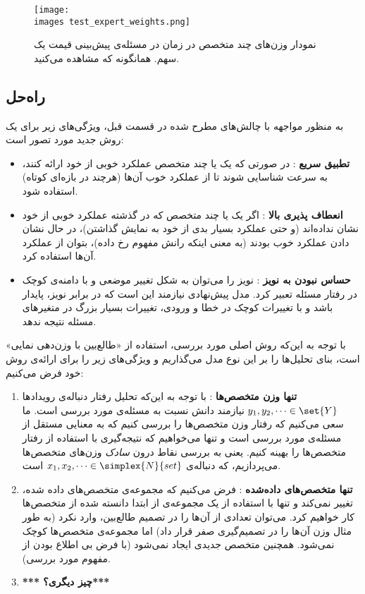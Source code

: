 \begin{figure}[h!]
\texttt{[image: \\images test\_expert\_weights.png]}
\caption{
نمودار وزن‌های چند متخصص در زمان در مسئله‌ی پیش‌بینی قیمت یک سهم. همانگونه که مشاهده می‌کنید.
}
\label{fig:wmstatic}
\end{figure}




\subsection{
راه‌حل
} 
به منظور مواجهه با چالش‌های مطرح شده در قسمت قبل، ویژگی‌های زیر برای یک روش جدید مورد تصور است:
\begin{itemize}
\item \textbf{
تطبیق سریع
}: 
در صورتی که یک یا چند متخصص عملکرد خوبی از خود ارائه کنند، به سرعت شناسایی شوند تا از عملکرد خوب آن‌ها (هرچند در بازه‌ای کوتاه) استفاده شود.
\item \textbf{
انعطاف پذیری بالا
}: 
اگر یک یا چند متخصص که در گذشته عملکرد خوبی از خود نشان نداده‌اند (و حتی عملکرد بسیار بدی از خود به نمایش گذاشتن)، در حال نشان دادن عملکرد خوب بودند (به معنی اینکه رانش مفهوم رخ داده)، بتوان از عملکرد آن‌ها استفاده کرد.

\item \textbf{
حساس نبودن به نویز
}: 
نویز را می‌توان به شکل تغییر موضعی و با دامنه‌ی کوچک در رفتار مسئله تعبیر کرد. مدل پیش‌نهادی نیازمند این است که در برابر نویز، پایدار باشد و با تغییرات کوچک در خطا و ورودی، تغییرات بسیار بزرگ در متغیرهای مسئله نتیجه ندهد.

\end{itemize}

با توجه به این‌که روش اصلی مورد بررسی، استفاده از «طالع‌بین با وزن‌دهی نمایی» است، بنای تحلیل‌ها را بر این نوع مدل می‌گذاریم و ویژگی‌های زیر را برای ارائه‌ی روش خود فرض می‌کنیم:
\begin{enumerate}
\item \textbf{
تنها وزن متخصص‌ها
}: 
با توجه به این‌که تحلیل رفتار دنباله‌ی رویدادها 
$y_1, y_2, \cdots \in \set{Y}$ 
نیازمند دانش نسبت به مسئله‌ی مورد بررسی است. ما سعی می‌کنیم که رفتار وزن متخصص‌ها را بررسی کنیم که به معنایی مستقل از مسئله‌ی مورد بررسی است و تنها می‌خواهیم که نتیجه‌گیری با استفاده از رفتار متخصص‌ها را بهینه کنیم. یعنی به بررسی نقاط درون 
\textit{
سادک
} 
وزن‌های متخصص‌ها می‌پردازیم، که دنباله‌ی 
$x_1, x_2, \cdots \in \simplex{N}{set} $ 
است.

\item \textbf{
تنها متخصص‌های داده‌شده
}: 
فرض می‌کنیم که مجموعه‌ی متخصص‌های داده شده، تغییر نمی‌کند و تنها با استفاده از یک مجموعه‌ی از ابتدا دانسته شده از متخصص‌ها کار خواهیم کرد. می‌توان تعدادی از آن‌ها را در تصمیم طالع‌بین، وارد نکرد (به طور مثال وزن آن‌ها را در تصمیم‌گیری صفر قرار داد) اما مجموعه‌ی متخصص‌ها کوچک نمی‌شود. همچنین متخصص جدیدی ایجاد نمی‌شود (با فرض بی اطلاع بودن از مفهوم مورد بررسی).

\item \textbf{
*** چیز دیگری؟***
}

\end{enumerate}

